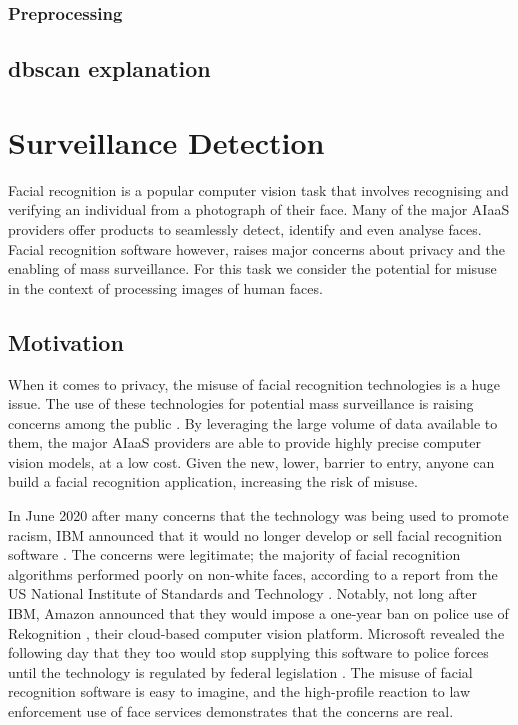 \documentclass[a4paper,12pt]{report}
\begin{document}
\subsection{Preprocessing}

\section{dbscan explanation}
\label{section:dbscan}

\chapter{Surveillance Detection}
Facial recognition is a popular computer vision task that involves recognising and verifying an individual from a photograph of their face. Many of the major AIaaS providers offer products to seamlessly detect, identify and even analyse faces. Facial recognition software however, raises major concerns about privacy and the enabling of mass surveillance. For this task we consider the potential for misuse in the context of processing images of human faces. 

\section{Motivation}
When it comes to privacy, the misuse of facial recognition technologies is a huge issue. The use of these technologies for potential mass surveillance is raising concerns among the public \cite{gates2011our}. By leveraging the large volume of data available to them, the major AIaaS providers are able to provide highly precise computer vision models, at a low cost. Given the new, lower, barrier to entry, anyone can build a facial recognition application, increasing the risk of misuse. 

In June 2020 after many concerns that the technology was being used to promote racism, IBM announced that it would no longer develop or sell facial recognition software \cite{IBMsaysi68}. The concerns were legitimate; the majority of facial recognition algorithms performed poorly on non-white faces, according to a report from the US National Institute of Standards and Technology \cite{NISTStud33:online}. Notably, not long after IBM, Amazon announced that they would impose a one-year ban on police use of Rekognition \cite{Weareimp80:online}, their cloud-based computer vision platform. Microsoft revealed the following day that they too would stop supplying this software to police forces until the technology is regulated by federal legislation \cite{greene2020microsoft}. The misuse of facial recognition software is easy to imagine, and the high-profile reaction to law enforcement use of face services demonstrates that the concerns are real.
\end{document}
